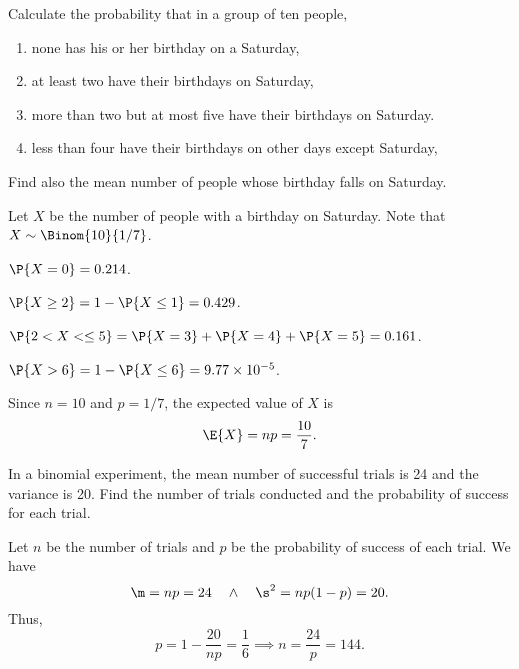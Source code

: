 \begin{problem}
    Calculate the probability that in a group of ten people,
    \begin{enumerate}
        \item none has his or her birthday on a Saturday,
        \item at least two have their birthdays on Saturday,
        \item more than two but at most five have their birthdays on Saturday.
        \item less than four have their birthdays on other days except Saturday,
    \end{enumerate}
    Find also the mean number of people whose birthday falls on Saturday.
\end{problem}
\begin{solution}
    Let $X$ be the number of people with a birthday on Saturday. Note that $X \sim \Binom{10}{1/7}$.
    \begin{ppart}
        $\P{X = 0} = 0.214$.
    \end{ppart}
    \begin{ppart}
        $\P{X \geq 2} = 1 - \P{X \leq 1} = 0.429$.
    \end{ppart}
    \begin{ppart}
        $\P{2 < X < \leq 5} = \P{X = 3} + \P{X = 4} + \P{X = 5} = 0.161$.
    \end{ppart}
    \begin{ppart}
        $\P{X > 6} = 1 - \P{X \leq 6} = 9.77 \times 10^{-5}$.
    \end{ppart}

    Since $n = 10$ and $p = 1/7$, the expected value of $X$ is \[\E{X} = np = \frac{10}{7}.\]
\end{solution}

\begin{problem}
    In a binomial experiment, the mean number of successful trials is 24 and the variance is 20. Find the number of trials conducted and the probability of success for each trial.
\end{problem}
\begin{solution}
    Let $n$ be the number of trials and $p$ be the probability of success of each trial. We have \[\m = np = 24 \quad \land \quad \s^2 = np(1-p) = 20.\] Thus, \[p = 1 - \frac{20}{np} = \frac16 \implies n = \frac{24}{p} = 144.\]
\end{solution}

